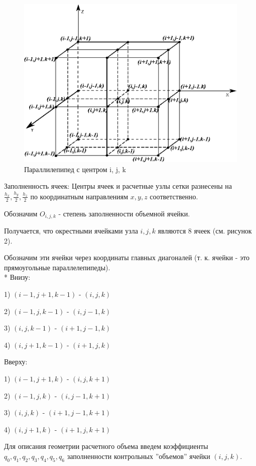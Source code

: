 \documentclass[12pt]{article}
\begin{document}
\begin{figure}[h!]
	\centering
	\includegraphics {figs/ris2}
	\caption{ Параллилепипед с центром i, j, k}
\end{figure}

Заполненность ячеек:
Центры ячеек и расчетные узлы сетки разнесены на $ \frac{h_x}{2}, \frac{h_y}{2}, \frac{h_z}{2} $ по координатным направлениям $x, y, z$ соответственно.

Обозначим $O_{i,j,k}$ - степень заполненности объемной ячейки. 


Получается, что окрестными ячейками узла ${i,j,k}$ являются 8 ячеек (см. рисунок 2).

Обозначим эти ячейки через координаты главных диагоналей (т. к. ячейки - это прямоугольные параллелепипеды).
\\*
\newpage
Внизу:

1) ${(i-1,j+1,k-1)}$ - ${(i,j,k)}$ 

2) ${(i-1,j,k-1)}$ - ${(i,j-1,k)}$ 

3) ${(i,j,k-1)}$ - ${(i+1,j-1,k)}$ 

4) ${(i,j+1,k-1)}$ - ${(i+1,j,k)}$ 

Вверху:

1) ${(i-1,j+1,k)}$ - ${(i,j,k+1)}$ 

2) ${(i-1,j,k)}$ - ${(i,j-1,k+1)}$ 

3) ${(i,j,k)}$ - ${(i+1,j-1,k+1)}$ 

4) ${(i,j+1,k)}$ - ${(i+1,j,k+1)}$ 

{\color{red}{Читай метод конечных объемов (Рояк)}}


Для описания геометрии расчетного объема введем коэффициенты ${q_0, q_1,q_2,q_3,q_4,q_5,q_6}$ заполненности контрольных  ''объемов'' ячейки ${(i,j,k)}$.
\end{document}
